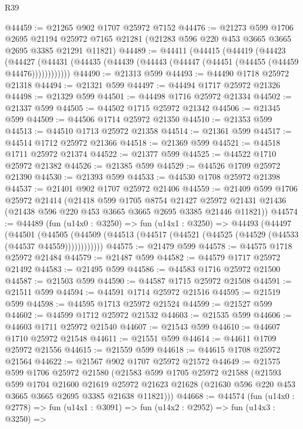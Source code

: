 \begin{lexlean}{R39}
\begin{coremodule}
@44459 := @21265 @902 @1707 @25972 @7152
@44476 := @21273
    @599
    @1706
    @2695
    @21194
    @25972
    @7165
    @21281
    (@21283 @596 @220 @453 @3665 @3665 @2695 @3385 @21291 @11821)
@44489 := @44411
    (@44415
      (@44419
        (@44423
          (@44427 (@44431 (@44435 (@44439 (@44443 (@44447 (@44451 (@44455 (@44459 @44476))))))))))))
@44490 := @21313 @599
@44493 := @44490 @1718 @25972 @21318
@44494 := @21321 @599
@44497 := @44494 @1717 @25972 @21326
@44498 := @21329 @599
@44501 := @44498 @1716 @25972 @21334
@44502 := @21337 @599
@44505 := @44502 @1715 @25972 @21342
@44506 := @21345 @599
@44509 := @44506 @1714 @25972 @21350
@44510 := @21353 @599
@44513 := @44510 @1713 @25972 @21358
@44514 := @21361 @599
@44517 := @44514 @1712 @25972 @21366
@44518 := @21369 @599
@44521 := @44518 @1711 @25972 @21374
@44522 := @21377 @599
@44525 := @44522 @1710 @25972 @21382
@44526 := @21385 @599
@44529 := @44526 @1709 @25972 @21390
@44530 := @21393 @599
@44533 := @44530 @1708 @25972 @21398
@44537 := @21401 @902 @1707 @25972 @21406
@44559 := @21409
    @599
    @1706
    @25972
    @21414
    (@21418
      @599
      @1705
      @8754
      @21427
      @25972
      @21431
      @21436
      (@21438 @596 @220 @453 @3665 @3665 @2695 @3385 @21446 @11821))
@44574 := @44489
    (fun (u14x0 : @3250) =>
    fun (u14x1 : @3250) =>
    @44493
      (@44497
        (@44501
          (@44505 (@44509 (@44513 (@44517 (@44521 (@44525 (@44529 (@44533 (@44537 @44559))))))))))))
@44575 := @21479 @599
@44578 := @44575 @1718 @25972 @21484
@44579 := @21487 @599
@44582 := @44579 @1717 @25972 @21492
@44583 := @21495 @599
@44586 := @44583 @1716 @25972 @21500
@44587 := @21503 @599
@44590 := @44587 @1715 @25972 @21508
@44591 := @21511 @599
@44594 := @44591 @1714 @25972 @21516
@44595 := @21519 @599
@44598 := @44595 @1713 @25972 @21524
@44599 := @21527 @599
@44602 := @44599 @1712 @25972 @21532
@44603 := @21535 @599
@44606 := @44603 @1711 @25972 @21540
@44607 := @21543 @599
@44610 := @44607 @1710 @25972 @21548
@44611 := @21551 @599
@44614 := @44611 @1709 @25972 @21556
@44615 := @21559 @599
@44618 := @44615 @1708 @25972 @21564
@44622 := @21567 @902 @1707 @25972 @21572
@44649 := @21575
    @599
    @1706
    @25972
    @21580
    (@21583
      @599
      @1705
      @25972
      @21588
      (@21593
        @599
        @1704
        @21600
        @21619
        @25972
        @21623
        @21628
        (@21630 @596 @220 @453 @3665 @3665 @2695 @3385 @21638 @11821)))
@44668 := @44574
    (fun (u14x0 : @2778) =>
    fun (u14x1 : @3091) =>
    fun (u14x2 : @2952) =>
    fun (u14x3 : @3250) =>

\end{coremodule}
\end{lexlean}
